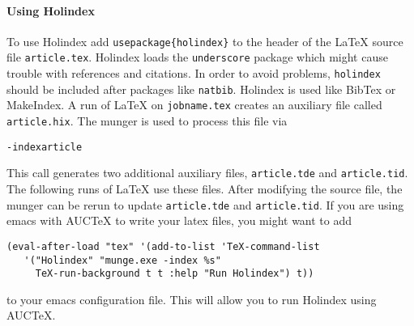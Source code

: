 \paragraph{Using Holindex}
To use Holindex add \texttt{\bs{}usepackage\{holindex\}} to the header
of the \LaTeX{} source file \texttt{article.tex}. Holindex loads the
\texttt{underscore} package which might cause trouble with references
and citations. In order to avoid problems,
\texttt{holindex} should be included after packages
like \texttt{natbib}. Holindex is used like BibTex or
MakeIndex. A run of \LaTeX{} on \texttt{jobname.tex} creates an
auxiliary file called \texttt{article.hix}. The munger is used to
process this file via
\begin{alltt}
   \munge -index article
\end{alltt}
This call generates two additional auxiliary files,
\texttt{article.tde} and \texttt{article.tid}.  The following runs of
\LaTeX{} use these files. After modifying the source file, the munger
can be rerun to update \texttt{article.tde} and \texttt{article.tid}.
If you are using emacs with AUCTeX to write your latex files, you might
want to add
\begin{verbatim}
(eval-after-load "tex" '(add-to-list 'TeX-command-list
   '("Holindex" "munge.exe -index %s"
     TeX-run-background t t :help "Run Holindex") t))
\end{verbatim}
to your emacs configuration file. This will allow
you to run Holindex using AUCTeX.

